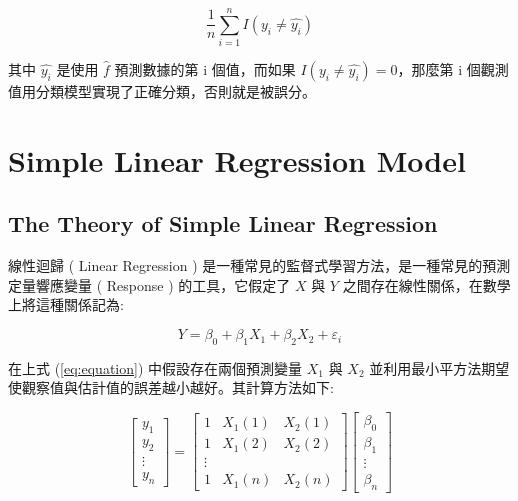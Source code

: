 \begin{equation}
\frac{1}{n}\sum_{i=1}^{n}I(y_i \neq \hat{y_i})
\end{equation}

其中 $\hat{y_i}$ 是使用 $\hat{f}$ 預測數據的第 i 個值，而如果 $I(y_i \neq \hat{y_i})=0$，那麼第 i 個觀測值用分類模型實現了正確分類，否則就是被誤分。


\section{Simple Linear Regression Model}

\subsection{The Theory of Simple Linear Regression}

線性迴歸 ( Linear Regression ) 是一種常見的監督式學習方法，是一種常見的預測定量響應變量 ( Response ) 的工具，它假定了 $X$ 與 $Y$ 之間存在線性關係，在數學上將這種關係記為:

\begin{equation}\label{eq:equation}
Y = \beta_0 + \beta_1 X_1 +\beta_2 X_2 + \varepsilon_i
\end{equation} 

在上式 (\ref{eq:equation}) 中假設存在兩個預測變量 $X_1$ 與 $X_2$ 並利用最小平方法期望使觀察值與估計值的誤差越小越好。其計算方法如下:

$$ \left[
       \begin{array}{clr}
            y_1 \\
            y_2 \\
            \vdots \\
            y_n
       \end{array} \right] = \left[
       \begin{array}{clr}
            1 & X_1(1) & X_2(1)\\
            1 & X_1(2) & X_2(2)\\
            \vdots \\
            1 & X_1(n) & X_2(n)
       \end{array}\right] \left[
       \begin{array}{clr}
            \beta_0 \\
            \beta_1 \\
            \vdots \\
            \beta_n 
       \end{array}\right] $$ 
       
